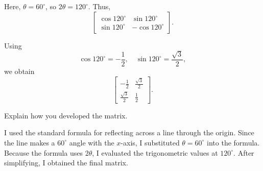 \documentclass{ximera}
\begin{document}
Here, $\theta=60^\circ$, so $2\theta=120^\circ$. Thus,
\[
\begin{bmatrix}
\cos 120^\circ & \sin 120^\circ\\
\sin 120^\circ & -\cos 120^\circ
\end{bmatrix}.
\]

Using
\[
\cos 120^\circ=-\frac12, \quad \sin 120^\circ=\frac{\sqrt3}{2},
\]
we obtain
\[
\begin{bmatrix}
-\frac12 & \frac{\sqrt3}{2}\\
\frac{\sqrt3}{2} & \frac12
\end{bmatrix}.
\]

\begin{problem}
Explain how you developed the matrix.
\end{problem}

I used the standard formula for reflecting across a line through the origin. Since the line makes a $60^\circ$ angle with the $x$-axis, I substituted $\theta=60^\circ$ into the formula. Because the formula uses $2\theta$, I evaluated the trigonometric values at $120^\circ$. After simplifying, I obtained the final matrix.
\end{document}
